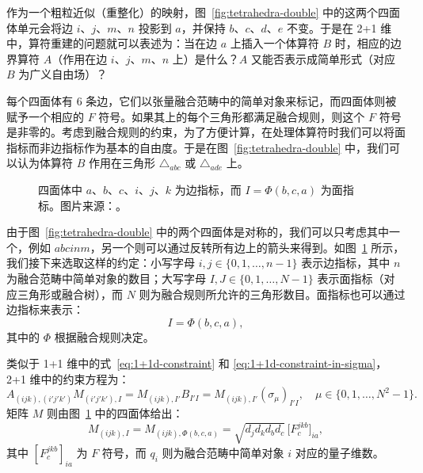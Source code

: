 作为一个粗粒近似（重整化）的映射，图~\ref{fig:tetrahedra-double} 中的这两个四面体单元会将边 $i$、$j$、$m$、$n$ 投影到 $a$，并保持 $b$、$c$、$d$、$e$ 不变。于是在 2+1 维中，算符重建的问题就可以表述为：当在边 $a$ 上插入一个体算符 $B$ 时，相应的边界算符 $A$（作用在边 $i$、$j$、$m$、$n$ 上）是什么？$A$ 又能否表示成简单形式（对应 $B$ 为广义自由场）？

每个四面体有 6 条边，它们以张量融合范畴中的简单对象来标记，而四面体则被赋予一个相应的 $F$ 符号。如果其上的每个三角形都满足融合规则，则这个 $F$ 符号是非零的。考虑到融合规则的约束，为了方便计算，在处理体算符时我们可以将面指标而非边指标作为基本的自由度。于是在图~\ref{fig:tetrahedra-double} 中，我们可以认为体算符 $B$ 作用在三角形 $\triangle_{abc}$ 或 $\triangle_{ade}$ 上。

\begin{figure}[htb]
  \centering
  \caption[四面体中的边指标与面指标]{四面体中 $a$、$b$、$c$、$i$、$j$、$k$ 为边指标，而 $I=\Phi(b,c,a)$ 为面指标。图片来源：\parencite{zeng2023bulk}。}
  \label{fig:tetrahedra-single}
\end{figure}

由于图~\ref{fig:tetrahedra-double} 中的两个四面体是对称的，我们可以只考虑其中一个，例如 $abcinm$，另一个则可以通过反转所有边上的箭头来得到。如图~\ref{fig:tetrahedra-single} 所示，我们接下来选取这样的约定：小写字母 $i,j\in\{0,1,\dots,n-1\}$ 表示边指标，其中 $n$ 为融合范畴中简单对象的数目；大写字母 $I, J\in \{0,1,\dots,N-1\}$ 表示面指标（对应三角形或融合树），而 $N$ 则为融合规则所允许的三角形数目。面指标也可以通过边指标来表示：
\begin{equation}
  I = \Phi(b,c,a),
\end{equation}
其中的 $\Phi$ 根据融合规则决定。

类似于 1+1 维中的式~\eqref{eq:1+1d-constraint} 和 \eqref{eq:1+1d-constraint-in-sigma}，2+1 维中的约束方程为：
\begin{equation}
    A_{(ijk), (i'j'k')} M_{(i'j'k'), I}
  = M_{(ijk), I'} B_{I'I}
  = M_{(ijk), I'} (\sigma_\mu)_{I'I}, \quad \mu \in\{ 0,1,\dots,N^2-1 \}.
\end{equation}
矩阵 $M$ 则由图~\ref{fig:tetrahedra-single} 中的四面体给出：
\begin{equation}
  M_{(ijk), I} = M_{(ijk), \Phi(b,c,a)} = \sqrt{d_j d_k d_b d_c} \, \bigl[ F^{jkb}_c \bigr]_{ia},
\end{equation}
其中 $[F^{jkb}_c]_{ia}$ 为 $F$ 符号，而 $q_i$ 则为融合范畴中简单对象 $i$ 对应的量子维数。

